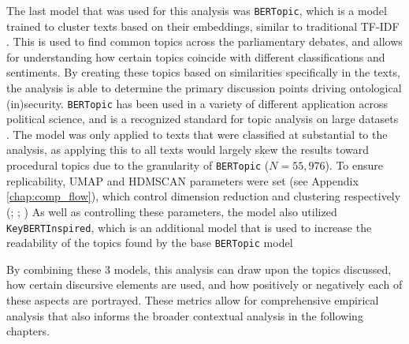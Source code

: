 The last model that was used for this analysis was \texttt{BERTopic}, which is a model trained to cluster texts based on their embeddings, similar to traditional TF-IDF \citep[pg.~2]{grootendorst2022}. This is used to find common topics across the parliamentary debates, and allows for understanding how certain topics coincide with different classifications and sentiments. By creating these topics based on similarities specifically in the texts, the analysis is able to determine the primary discussion points driving ontological (in)security. \texttt{BERTopic} has been used in a variety of different application across political science, and is a recognized standard for topic analysis on large datasets \citep{}. The model was only applied to texts that were classified at substantial to the analysis, as applying this to all texts would largely skew the results toward procedural topics due to the granularity of \texttt{BERTopic} ($N=55,976$).  To ensure replicability, UMAP and HDMSCAN parameters were set (see Appendix \ref{chap:comp_flow}), which control dimension reduction and clustering respectively (\citealp[pg.~1-3]{grootendorst2022}; \citealp[pg.~1-3]{mcinnes2020}; \citealp[pg.~1-2]{mcinnes2017}) As well as controlling these parameters, the model also utilized \texttt{KeyBERTInspired}, which is an additional model that is used to increase the readability of the topics found by the base \texttt{BERTopic} model \citep{grootendorst2022}

By combining these 3 models, this analysis can draw upon the topics discussed, how certain discursive elements are used, and how positively or negatively each of these aspects are portrayed. These metrics allow for comprehensive empirical analysis that also informs the broader contextual analysis in the following chapters.






